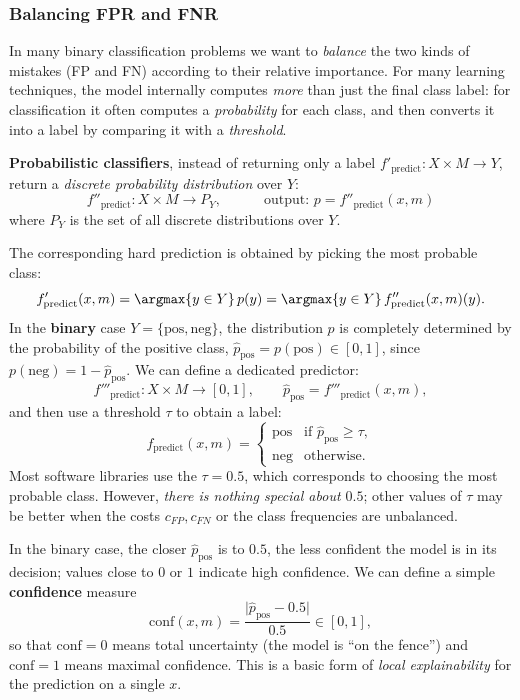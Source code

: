 \subsubsection{Balancing FPR and FNR}
\label{subsec:balancing-fpr-fnr}

In many binary classification problems we want to \emph{balance} the two kinds of mistakes (FP and FN) according to their relative importance. For many learning techniques, the model internally computes \emph{more} than just the final class label: for classification it often computes a \emph{probability} for each class, and then converts it into a label by comparing it with a \emph{threshold}.

\smallskip

\textbf{Probabilistic classifiers}, instead of returning only a label $f'_{\text{predict}} : X \times M \to Y$, return a \emph{discrete probability distribution} over $Y$:
$$
  f''_{\text{predict}} : X \times M \to P_Y,
\qquad \quad \text{output: }
  p = f''_{\text{predict}}(x,m)
$$
where $P_Y$ is the set of all discrete distributions over $Y$.

The corresponding hard prediction is obtained by picking the most probable class:
$$
  f'_{\text{predict}}(x,m)
  = \argmax{y \in Y} \, p(y)
  = \argmax{y \in Y} \, f''_{\text{predict}}(x,m)(y).
$$
In the \textbf{binary} case $Y = \{\text{pos}, \text{neg}\}$, the distribution $p$ is completely determined by the probability of the positive class, $\hat{p}_{\text{pos}} = p(\text{pos}) \in [0,1]$, since $p(\text{neg}) = 1 - \hat{p}_{\text{pos}}$. We can define a dedicated predictor:
$$
  f'''_{\text{predict}} : X \times M \to [0,1],
  \qquad
  \hat{p}_{\text{pos}} = f'''_{\text{predict}}(x,m),
$$
and then use a threshold $\tau$ to obtain a label:
$$
  f_{\text{predict}}(x,m) =
  \begin{cases}
    \text{pos} & \text{if } \hat{p}_{\text{pos}} \ge \tau,\\[0.2em]
    \text{neg} & \text{otherwise.}
  \end{cases}
$$
Most software libraries use the  $\tau = 0.5$, which corresponds to choosing the most probable class. However, \emph{there is nothing special about $0.5$}; other values of $\tau$ may be better when the costs $c_{FP}, c_{FN}$ or the class frequencies are unbalanced.

In the binary case, the closer $\hat{p}_{\text{pos}}$ is to $0.5$, the less confident the model is in its decision; values close to $0$ or $1$ indicate high confidence. We can define a simple \textbf{confidence} measure
$$
  \text{conf}(x,m)
  = \frac{\lvert \hat{p}_{\text{pos}} - 0.5 \rvert}{0.5}
  \in [0,1],
$$
so that $\text{conf} = 0$ means total uncertainty (the model is “on the fence”) and $\text{conf} = 1$ means maximal confidence. This is a basic form of \emph{local explainability} for the prediction on a single $x$.

